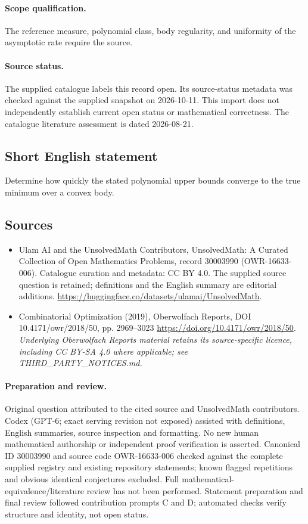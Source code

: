 \documentclass[11pt]{article}
\begin{document}
\paragraph{Scope qualification.}
The reference measure, polynomial class, body regularity, and uniformity of the asymptotic rate require the source.
\paragraph{Source status.}
The supplied catalogue labels this record open. Its source-status metadata was checked against the supplied snapshot on 2026-10-11. This import does not independently establish current open status or mathematical correctness. The catalogue literature assessment is dated 2026-08-21.
\subsection{Short English statement}
Determine how quickly the stated polynomial upper bounds converge to the true minimum over a convex body.
\subsection{Sources}
\begin{itemize}
\item[S1] Ulam AI and the UnsolvedMath Contributors, UnsolvedMath: A Curated Collection of Open Mathematics Problems, record 30003990 (OWR-16633-006). Catalogue curation and metadata: CC BY 4.0. The supplied source question is retained; definitions and the English summary are editorial additions.
\url{https://huggingface.co/datasets/ulamai/UnsolvedMath}.
\item[S2] Combinatorial Optimization (2019), Oberwolfach Reports, DOI 10.4171/owr/2018/50, pp. 2969--3023
\url{https://doi.org/10.4171/owr/2018/50}.
\textit{Underlying Oberwolfach Reports material retains its source-specific licence, including CC BY-SA 4.0 where applicable; see THIRD\_PARTY\_NOTICES.md.}
\end{itemize}
\paragraph{Preparation and review.}
Original question attributed to the cited source and UnsolvedMath contributors. Codex (GPT-6; exact serving revision not exposed) assisted with definitions, English summaries, source inspection and formatting. No new human mathematical authorship or independent proof verification is asserted. Canonical ID 30003990 and source code OWR-16633-006 checked against the complete supplied registry and existing repository statements; known flagged repetitions and obvious identical conjectures excluded. Full mathematical-equivalence/literature review has not been performed. Statement preparation and final review followed contribution prompts C and D; automated checks verify structure and identity, not open status.
\label{end:30003990}
\end{document}
